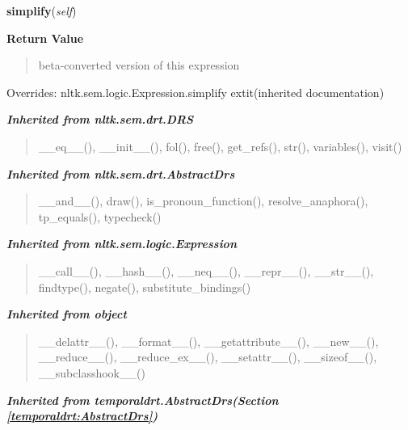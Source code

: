    \vspace{0.5ex}

\hspace{.8\funcindent}\begin{boxedminipage}{\funcwidth}

    \raggedright \textbf{simplify}(\textit{self})

\setlength{\parskip}{2ex}
\setlength{\parskip}{1ex}
      \textbf{Return Value}
    \vspace{-1ex}

      \begin{quote}
      beta-converted version of this expression

      \end{quote}

      Overrides: nltk.sem.logic.Expression.simplify 	extit{(inherited documentation)}

    \end{boxedminipage}


\large{\textbf{\textit{Inherited from nltk.sem.drt.DRS}}}

\begin{quote}
\_\_eq\_\_(), \_\_init\_\_(), fol(), free(), get\_refs(), str(), variables(), visit()
\end{quote}

\large{\textbf{\textit{Inherited from nltk.sem.drt.AbstractDrs}}}

\begin{quote}
\_\_and\_\_(), draw(), is\_pronoun\_function(), resolve\_anaphora(), tp\_equals(), typecheck()
\end{quote}

\large{\textbf{\textit{Inherited from nltk.sem.logic.Expression}}}

\begin{quote}
\_\_call\_\_(), \_\_hash\_\_(), \_\_neq\_\_(), \_\_repr\_\_(), \_\_str\_\_(), findtype(), negate(), substitute\_bindings()
\end{quote}

\large{\textbf{\textit{Inherited from object}}}

\begin{quote}
\_\_delattr\_\_(), \_\_format\_\_(), \_\_getattribute\_\_(), \_\_new\_\_(), \_\_reduce\_\_(), \_\_reduce\_ex\_\_(), \_\_setattr\_\_(), \_\_sizeof\_\_(), \_\_subclasshook\_\_()
\end{quote}

\large{\textbf{\textit{Inherited from temporaldrt.AbstractDrs\textit{(Section \ref{temporaldrt:AbstractDrs})}}}}

